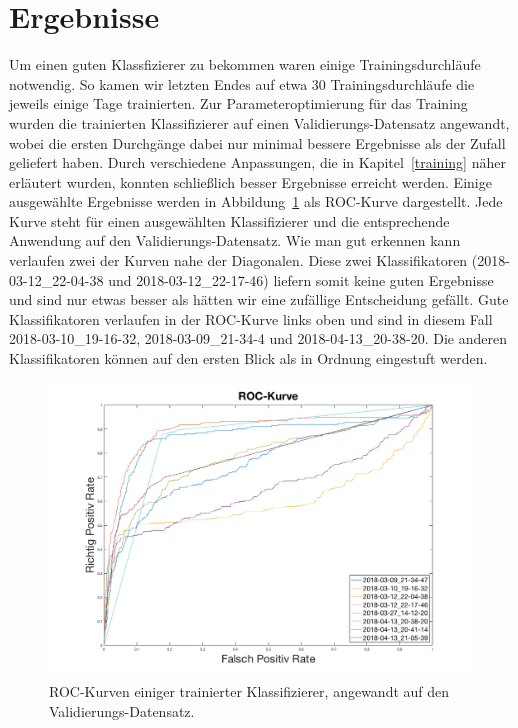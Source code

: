 \section{Ergebnisse}

Um einen guten Klassfizierer zu bekommen waren einige Trainingsdurchläufe notwendig. So kamen wir letzten Endes auf etwa 30 Trainingsdurchläufe die jeweils einige Tage trainierten. Zur Parameteroptimierung für das Training wurden die trainierten Klassifizierer auf einen Validierungs-Datensatz angewandt, wobei die ersten Durchgänge dabei nur minimal bessere Ergebnisse als der Zufall geliefert haben. Durch verschiedene Anpassungen, die in Kapitel~\ref{training} näher erläutert wurden, konnten schließlich besser Ergebnisse erreicht werden. Einige ausgewählte Ergebnisse werden in Abbildung~\ref{fig:roc} als ROC-Kurve dargestellt. Jede Kurve steht für einen ausgewählten Klassifizierer und die entsprechende Anwendung auf den Validierungs-Datensatz. Wie man gut erkennen kann verlaufen zwei der Kurven nahe der Diagonalen. Diese zwei Klassifikatoren (2018-03-12\_22-04-38 und 2018-03-12\_22-17-46) liefern somit keine guten Ergebnisse und sind nur etwas besser als hätten wir eine zufällige Entscheidung gefällt. Gute Klassifikatoren verlaufen in der ROC-Kurve links oben und sind in diesem Fall 2018-03-10\_19-16-32, 2018-03-09\_21-34-4 und 2018-04-13\_20-38-20. Die anderen Klassifikatoren können auf den ersten Blick als in Ordnung eingestuft werden.

\begin{figure}[htb!]
	\begin{center}
		\includegraphics[width=\textwidth]{./pics/evaluation/roc_analysis.png}
		\caption{ROC-Kurven einiger trainierter Klassifizierer, angewandt auf den Validierungs-Datensatz.}
		\label{fig:roc}
    \end{center}
\end{figure}

